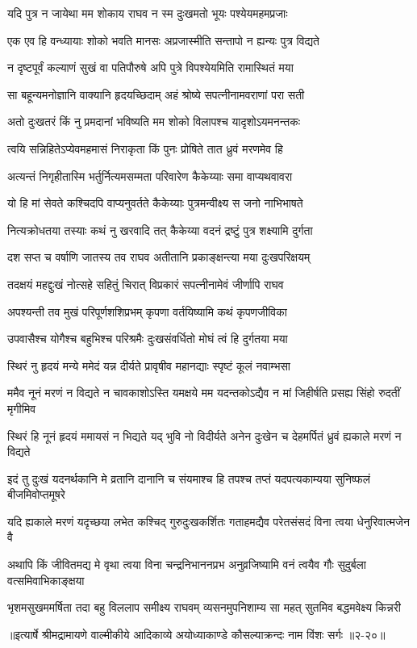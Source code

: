 \twolineshloka
{यदि पुत्र न जायेथा मम शोकाय राघव}
{न स्म दुःखमतो भूयः पश्येयमहमप्रजाः} %

\twolineshloka
{एक एव हि वन्ध्यायाः शोको भवति मानसः}
{अप्रजास्मीति सन्तापो न ह्यन्यः पुत्र विद्यते} %

\twolineshloka
{न दृष्टपूर्वं कल्याणं सुखं वा पतिपौरुषे}
{अपि पुत्रे विपश्येयमिति रामास्थितं मया} %

\twolineshloka
{सा बहून्यमनोज्ञानि वाक्यानि हृदयच्छिदाम्}
{अहं श्रोष्ये सपत्नीनामवराणां परा सती} %

\twolineshloka
{अतो दुःखतरं किं नु प्रमदानां भविष्यति}
{मम शोको विलापश्च यादृशोऽयमनन्तकः} %

\twolineshloka
{त्वयि सन्निहितेऽप्येवमहमासं निराकृता}
{किं पुनः प्रोषिते तात ध्रुवं मरणमेव हि} %

\twolineshloka
{अत्यन्तं निगृहीतास्मि भर्तुर्नित्यमसम्मता}
{परिवारेण कैकेय्याः समा वाप्यथवावरा} %

\twolineshloka
{यो हि मां सेवते कश्चिदपि वाप्यनुवर्तते}
{कैकेय्याः पुत्रमन्वीक्ष्य स जनो नाभिभाषते} %

\twolineshloka
{नित्यक्रोधतया तस्याः कथं नु खरवादि तत्}
{कैकेय्या वदनं द्रष्टुं पुत्र शक्ष्यामि दुर्गता} %

\twolineshloka
{दश सप्त च वर्षाणि जातस्य तव राघव}
{अतीतानि प्रकाङ्क्षन्त्या मया दुःखपरिक्षयम्} %

\twolineshloka
{तदक्षयं महद्दुःखं नोत्सहे सहितुं चिरात्}
{विप्रकारं सपत्नीनामेवं जीर्णापि राघव} %

\twolineshloka
{अपश्यन्ती तव मुखं परिपूर्णशशिप्रभम्}
{कृपणा वर्तयिष्यामि कथं कृपणजीविका} %

\twolineshloka
{उपवासैश्च योगैश्च बहुभिश्च परिश्रमैः}
{दुःखसंवर्धितो मोघं त्वं हि दुर्गतया मया} %

\twolineshloka
{स्थिरं नु हृदयं मन्ये ममेदं यन्न दीर्यते}
{प्रावृषीव महानद्याः स्पृष्टं कूलं नवाम्भसा} %

\twolineshloka
{ममैव नूनं मरणं न विद्यते न चावकाशोऽस्ति यमक्षये मम}
{यदन्तकोऽद्यैव न मां जिहीर्षति प्रसह्य सिंहो रुदतीं मृगीमिव} %

\twolineshloka
{स्थिरं हि नूनं हृदयं ममायसं न भिद्यते यद् भुवि नो विदीर्यते}
{अनेन दुःखेन च देहमर्पितं ध्रुवं ह्यकाले मरणं न विद्यते} %

\twolineshloka
{इदं तु दुःखं यदनर्थकानि मे व्रतानि दानानि च संयमाश्च हि}
{तपश्च तप्तं यदपत्यकाम्यया सुनिष्फलं बीजमिवोप्तमूषरे} %

\twolineshloka
{यदि ह्यकाले मरणं यदृच्छया लभेत कश्चिद् गुरुदुःखकर्शितः}
{गताहमद्यैव परेतसंसदं विना त्वया धेनुरिवात्मजेन वै} %

\twolineshloka
{अथापि किं जीवितमद्य मे वृथा त्वया विना चन्द्रनिभाननप्रभ}
{अनुव्रजिष्यामि वनं त्वयैव गौः सुदुर्बला वत्समिवाभिकाङ्क्षया} %

\twolineshloka
{भृशमसुखममर्षिता तदा बहु विललाप समीक्ष्य राघवम्}
{व्यसनमुपनिशाम्य सा महत् सुतमिव बद्धमवेक्ष्य किन्नरी} %


॥इत्यार्षे श्रीमद्रामायणे वाल्मीकीये आदिकाव्ये अयोध्याकाण्डे कौसल्याक्रन्दः नाम विंशः सर्गः ॥२-२०॥
